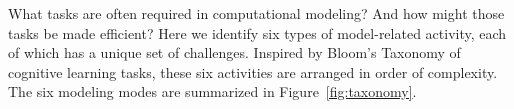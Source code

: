 \documentclass{article} %
\begin{document}
What tasks are often required in computational modeling? And how might those tasks be made efficient? Here we identify six types of model-related activity, each of which has a unique set of challenges. Inspired by Bloom's Taxonomy of cognitive learning tasks, these six activities are arranged in order of complexity. The six modeling modes are summarized in Figure~\ref{fig:taxonomy}.

\end{document}
